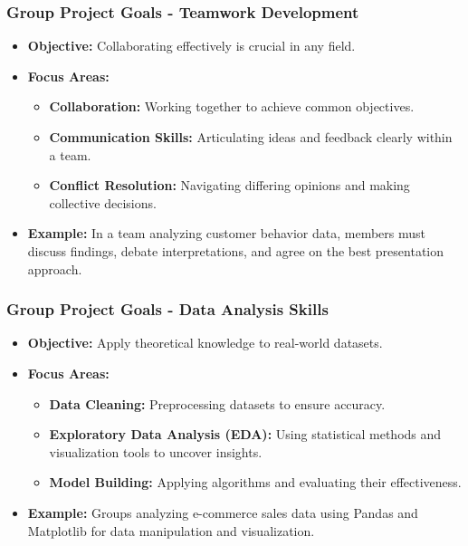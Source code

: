 \documentclass[aspectratio=169]{beamer}
\begin{document}
\begin{frame}[fragile]
    \frametitle{Group Project Goals - Teamwork Development}
    \begin{itemize}
        \item \textbf{Objective:} Collaborating effectively is crucial in any field.
        \item \textbf{Focus Areas:}
            \begin{itemize}
                \item \textbf{Collaboration:} Working together to achieve common objectives.
                \item \textbf{Communication Skills:} Articulating ideas and feedback clearly within a team.
                \item \textbf{Conflict Resolution:} Navigating differing opinions and making collective decisions.
            \end{itemize}
        \item \textbf{Example:} In a team analyzing customer behavior data, members must discuss findings, debate interpretations, and agree on the best presentation approach.
    \end{itemize}
\end{frame}

\begin{frame}[fragile]
    \frametitle{Group Project Goals - Data Analysis Skills}
    \begin{itemize}
        \item \textbf{Objective:} Apply theoretical knowledge to real-world datasets.
        \item \textbf{Focus Areas:}
            \begin{itemize}
                \item \textbf{Data Cleaning:} Preprocessing datasets to ensure accuracy.
                \item \textbf{Exploratory Data Analysis (EDA):} Using statistical methods and visualization tools to uncover insights.
                \item \textbf{Model Building:} Applying algorithms and evaluating their effectiveness.
            \end{itemize}
        \item \textbf{Example:} Groups analyzing e-commerce sales data using Pandas and Matplotlib for data manipulation and visualization.
    \end{itemize}
\end{frame}
\end{document}
